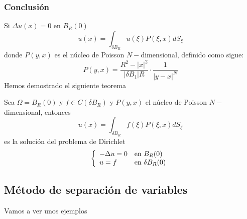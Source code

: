 \subsubsection*{Conclusión}
Si $\Delta u(x) = 0$ en $B_R(0)$
$$u(x) = \int_{\delta B_R} u(\xi)P(\xi, x)dS_\xi$$
donde $P(y,x)$ es el núcleo de Poisson $N-$dimensional, definido como sigue:
$$P(y,x) = \frac{R^2-|x|^2}{|\delta B_1| R}\cdot\frac{1}{|y-x|^N}$$
Hemos demostrado el siguiente teorema
\begin{theorem}
Sea $\Omega = B_R(0)$ y $f\in C(\delta B_R)$ y $P(y,x)$ el núcleo de Poisson $N-$dimensional, entonces
$$u(x) = \int_{\delta B_R} f(\xi)P(\xi, x)dS_\xi$$
es la solución del problema de Dirichlet
\begin{equation*}
\left\{
\begin{array}{l l}
-\Delta u = 0 & \text{en } B_R(0)\\
u=f & \text{en } \delta B_R(0)
\end{array}
\right.
\end{equation*}
\end{theorem}

\subsection{Método de separación de variables}
Vamos a ver unos ejemplos
